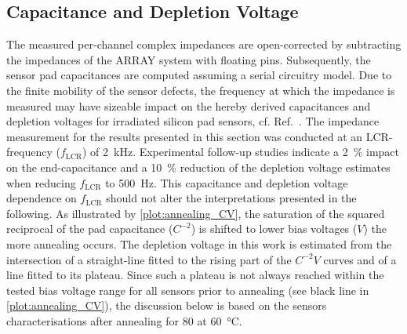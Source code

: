\subsection{Capacitance and Depletion Voltage}
\label{subsec:Udep}

The measured per-channel complex impedances are open-corrected by subtracting the impedances of the ARRAY system with floating pins.
Subsequently, the sensor pad capacitances are computed assuming a serial circuitry model.
Due to the finite mobility of the sensor defects, the frequency at which the impedance is measured may have sizeable impact on the hereby derived capacitances and depletion voltages for irradiated silicon pad sensors, cf. Ref.~\cite{Li1991}.
The impedance measurement for the results presented in this section was conducted at an LCR-frequency ($f_\text{LCR}$) of \SI{2}{\kilo\hertz}.
Experimental follow-up studies indicate a \SI{2}{\percent} impact on the end-capacitance and a \SI{10}{\percent} reduction of the depletion voltage estimates when reducing $f_\text{LCR}$ to \SI{500}{\hertz}.
This capacitance and depletion voltage dependence on $f_\text{LCR}$ should not alter the interpretations presented in the following.
As illustrated by \ref{plot:annealing_CV}, the saturation of the squared reciprocal of the pad capacitance ($C^{-2}$) is shifted to lower bias voltages ($V$) the more annealing occurs. 
The depletion voltage in this work is estimated from the intersection of a straight-line fitted to the rising part of the $C^{-2}V$ curves and of a line fitted to its plateau.
Since such a plateau is not always reached within the tested bias voltage range for all sensors prior to annealing (see black line in \ref{plot:annealing_CV}), the discussion below is based on the sensors characterisations after annealing for \SI{80}{\min} at \SI{60}{\celsius}. 


